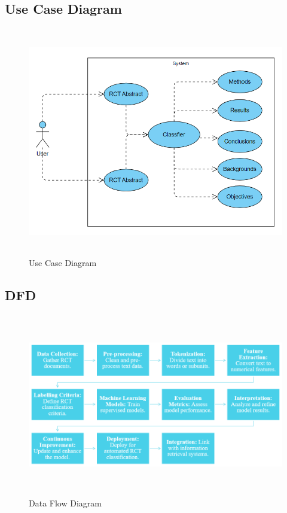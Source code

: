 \documentclass[12pt,a4paper]{report}     %
\begin{document}
\begin{normalsize}
{{\subsection{Use Case Diagram}
\begin{figure}[H]
    \centering
    \includegraphics[width=14cm,height=10cm]{Use Case Diagram.png }
    \caption{Use Case Diagram}
    \label{UCD}
\end{figure}
\subsection{DFD}
\begin{figure}[h]
    \centering
    \includegraphics[width=16cm,height=8cm]{DFD Diagram.png}
    \caption{Data Flow Diagram}
    \label{Data flow diagram}
\end{figure}
}}
\end{normalsize}
\end{document}
